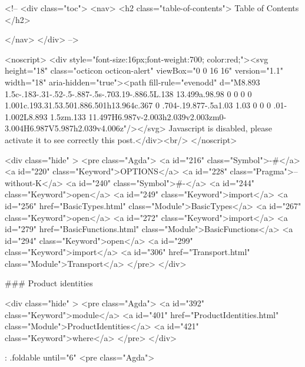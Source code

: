   <!-- 
  <div class="toc">
    <nav>
    <h2 class="table-of-contents"> Table of Contents </h2>
      

    </nav>
  </div>
   -->

  <noscript>
  <div style="font-size:16px;font-weight:700; color:red;"><svg height="18" class="octicon octicon-alert" viewBox="0 0 16 16" version="1.1" width="18" aria-hidden="true"><path fill-rule="evenodd" d="M8.893 1.5c-.183-.31-.52-.5-.887-.5s-.703.19-.886.5L.138 13.499a.98.98 0 0 0 0 1.001c.193.31.53.501.886.501h13.964c.367 0 .704-.19.877-.5a1.03 1.03 0 0 0 .01-1.002L8.893 1.5zm.133 11.497H6.987v-2.003h2.039v2.003zm0-3.004H6.987V5.987h2.039v4.006z"/></svg> Javascript is disabled, please activate it to see correctly this post.</div><br/>
  </noscript>

  <div class="hide" >
<pre class="Agda">
<a id="216" class="Symbol">{-#</a> <a id="220" class="Keyword">OPTIONS</a> <a id="228" class="Pragma">--without-K</a> <a id="240" class="Symbol">#-}</a>
<a id="244" class="Keyword">open</a> <a id="249" class="Keyword">import</a> <a id="256" href="BasicTypes.html" class="Module">BasicTypes</a>
<a id="267" class="Keyword">open</a> <a id="272" class="Keyword">import</a> <a id="279" href="BasicFunctions.html" class="Module">BasicFunctions</a>
<a id="294" class="Keyword">open</a> <a id="299" class="Keyword">import</a> <a id="306" href="Transport.html" class="Module">Transport</a>
</pre>
</div>

### Product identities

<div class="hide" >
<pre class="Agda">
<a id="392" class="Keyword">module</a>
  <a id="401" href="ProductIdentities.html" class="Module">ProductIdentities</a>
  <a id="421" class="Keyword">where</a>
</pre>
</div>


{: .foldable until="6"}
<pre class="Agda">

